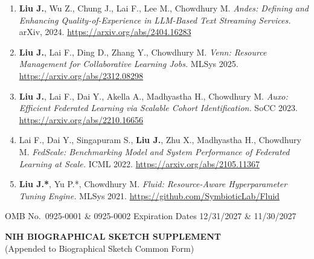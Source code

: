 \documentclass[10pt]{article}
\begin{document}
{\small
\begin{enumerate}[noitemsep, topsep=2pt, leftmargin=1.5em, label=\arabic*., start=6]

  \item \textbf{Liu J.}, Wu Z., Chung J., Lai F., Lee M., Chowdhury M.
        \textit{Andes: Defining and Enhancing Quality-of-Experience in LLM-Based Text Streaming Services.}
        arXiv, 2024. \url{https://arxiv.org/abs/2404.16283}

  \item \textbf{Liu J.}, Lai F., Ding D., Zhang Y., Chowdhury M.
        \textit{Venn: Resource Management for Collaborative Learning Jobs.}
        MLSys 2025. \url{https://arxiv.org/abs/2312.08298}

  \item \textbf{Liu J.}, Lai F., Dai Y., Akella A., Madhyastha H., Chowdhury M.
        \textit{Auxo: Efficient Federated Learning via Scalable Cohort Identification.}
        SoCC 2023. \url{https://arxiv.org/abs/2210.16656}

  \item Lai F., Dai Y., Singapuram S., \textbf{Liu J.}, Zhu X., Madhyastha H., Chowdhury M.
        \textit{FedScale: Benchmarking Model and System Performance of Federated Learning at Scale.}
        ICML 2022. \url{https://arxiv.org/abs/2105.11367}

  \item \textbf{Liu J.*}, Yu P.*, Chowdhury M.
        \textit{Fluid: Resource-Aware Hyperparameter Tuning Engine.}
        MLSys 2021. \url{https://github.com/SymbioticLab/Fluid}

\end{enumerate}
}

\newpage
{}

{\footnotesize OMB No.~0925-0001 \& 0925-0002 \quad Expiration Dates 12/31/2027 \& 11/30/2027}

\begin{center}
  {\large\bfseries NIH BIOGRAPHICAL SKETCH SUPPLEMENT}\\[2pt]
  {\small (Appended to Biographical Sketch Common Form)}
\end{center}
\vspace{-4pt}
\end{document}
